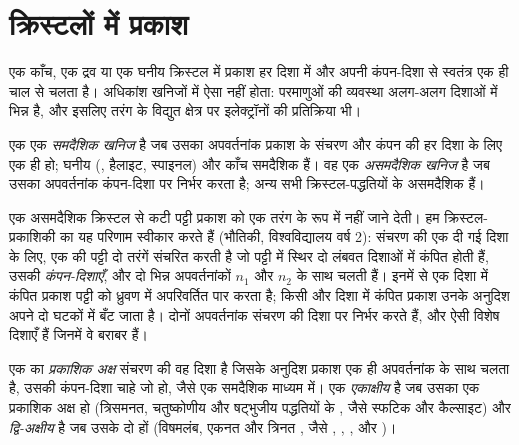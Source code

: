 \section{क्रिस्टलों में प्रकाश}

एक काँच, एक द्रव या एक घनीय क्रिस्टल में प्रकाश हर दिशा में और अपनी कंपन-दिशा से स्वतंत्र एक ही चाल से चलता है। अधिकांश
खनिजों में ऐसा नहीं होता: परमाणुओं की व्यवस्था अलग-अलग दिशाओं में भिन्न है, और इसलिए तरंग के विद्युत क्षेत्र पर
इलेक्ट्रॉनों की प्रतिक्रिया भी।

\begin{definition}\label{def:b1:optical-mineralogy:anisotropic}
एक  एक \emph{समदैशिक खनिज} है जब उसका अपवर्तनांक प्रकाश के संचरण और कंपन की हर दिशा के लिए
एक ही हो; घनीय  (, हैलाइट, स्पाइनल) और काँच समदैशिक हैं। वह एक \emph{असमदैशिक खनिज}
है जब उसका अपवर्तनांक कंपन-दिशा पर निर्भर करता है; अन्य सभी क्रिस्टल-पद्धतियों के  असमदैशिक हैं।
\end{definition}

एक असमदैशिक क्रिस्टल से कटी पट्टी प्रकाश को एक तरंग के रूप में नहीं जाने देती। हम क्रिस्टल-प्रकाशिकी का यह परिणाम
स्वीकार करते हैं (भौतिकी, विश्वविद्यालय वर्ष 2): संचरण की एक दी गई दिशा के लिए, एक  की पट्टी दो तरंगें
संचरित करती है जो पट्टी में स्थिर दो लंबवत दिशाओं में कंपित होती हैं, उसकी \emph{कंपन-दिशाएँ}, और दो भिन्न
अपवर्तनांकों $n_1$ और $n_2$ के साथ चलती हैं। इनमें से एक दिशा में कंपित प्रकाश पट्टी को ध्रुवण में अपरिवर्तित पार
करता है; किसी और दिशा में कंपित प्रकाश उनके अनुदिश अपने दो घटकों में बँट जाता है। दोनों अपवर्तनांक संचरण की दिशा
पर निर्भर करते हैं, और ऐसी विशेष दिशाएँ हैं जिनमें वे बराबर हैं।

\begin{definition}[प्रकाशिक अक्ष, एकाक्षीय और द्वि-अक्षीय खनिज]\label{def:b1:optical-mineralogy:optic-axis}
एक  का \emph{प्रकाशिक अक्ष} संचरण की वह दिशा है जिसके अनुदिश प्रकाश एक ही
अपवर्तनांक के साथ चलता है, उसकी कंपन-दिशा चाहे जो हो, जैसे एक समदैशिक माध्यम में। एक  \emph{एकाक्षीय}
है जब उसका एक प्रकाशिक अक्ष हो (त्रिसमनत, चतुष्कोणीय और षट्भुजीय पद्धतियों के , जैसे स्फटिक और कैल्साइट)
और \emph{द्वि-अक्षीय} है जब उसके दो हों (विषमलंब, एकनत और त्रिनत , जैसे , ,
,  और )।
\end{definition}

